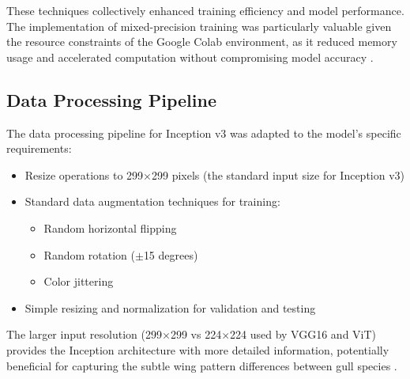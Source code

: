 These techniques collectively enhanced training efficiency and model performance. The implementation of mixed-precision training was particularly valuable given the resource constraints of the Google Colab environment, as it reduced memory usage and accelerated computation without compromising model accuracy \citep{ghani2024comprehensive}.

\subsection{Data Processing Pipeline}

The data processing pipeline for Inception v3 was adapted to the model's specific requirements:

\begin{itemize}
    \item Resize operations to 299$\times$299 pixels (the standard input size for Inception v3)
    \item Standard data augmentation techniques for training:
    \begin{itemize}
        \item Random horizontal flipping
        \item Random rotation ($\pm$15 degrees)
        \item Color jittering
    \end{itemize}
    \item Simple resizing and normalization for validation and testing
\end{itemize}

The larger input resolution (299$\times$299 vs 224$\times$224 used by VGG16 and ViT) provides the Inception architecture with more detailed information, potentially beneficial for capturing the subtle wing pattern differences between gull species \citep{dosovitskiy2020image}.
